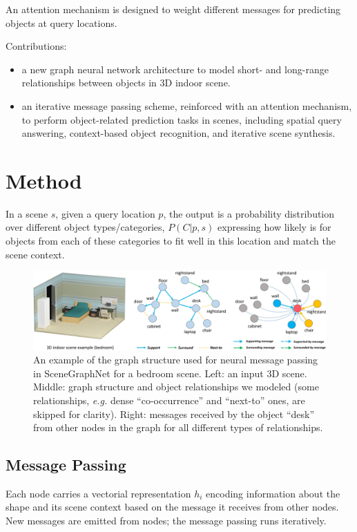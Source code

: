 \documentclass[10pt]{article}
\begin{document}
An attention mechanism is designed to weight different messages for predicting
objects at query locations.

Contributions:
%
\begin{itemize}
  \item a new graph neural network architecture to model short- and long-range
    relationships between objects in 3D indoor scene.
  \item an iterative message passing scheme, reinforced with an attention
    mechanism, to perform object-related prediction tasks in scenes, including
    spatial query answering, context-based object recognition, and iterative
    scene synthesis.
\end{itemize}

\section{Method}%
\label{sec:method}
In a scene $s$, given a query location $p$, the output is a probability
distribution over different object types/categories, $P(C \vert p, s)$
expressing how likely is for objects from each of these categories to fit well
in this location and match the scene context.
%
\begin{figure}[htpb]
  \centering
  \includegraphics[width=0.8\linewidth]{fig_4.png}
  \caption{An example of the graph structure used for neural message passing in
    SceneGraphNet for a bedroom scene. Left: an input 3D scene. Middle: graph
    structure and object relationships we modeled (some relationships,
    \textit{e.g.} dense ``co-occurrence'' and ``next-to'' ones, are skipped for
    clarity). Right: messages received by the object ``desk'' from other nodes
    in the graph for all different types of relationships.}%
  \label{fig:4}
\end{figure}

\subsection{Message Passing}%
\label{sec:passing}
Each node carries a vectorial representation $h_i$ encoding information about
the shape and its scene context based on the message it receives from other
nodes. New messages are emitted from nodes; the message passing runs
iteratively.
\end{document}
